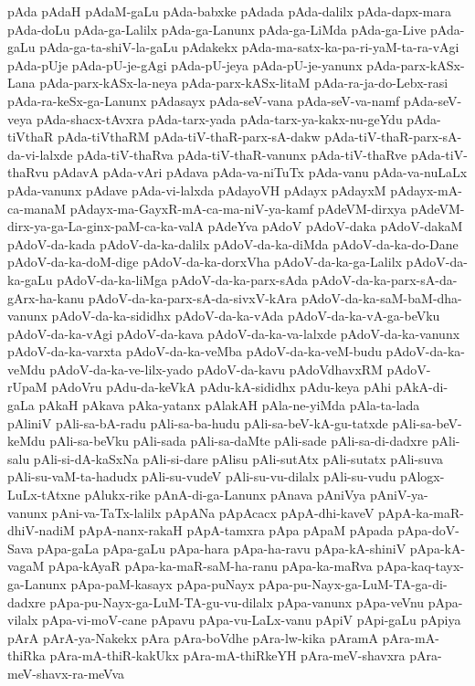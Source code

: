 {pAda
pAdaH
pAdaM-gaLu
pAda-babxke
pAdada
pAda-dalilx
pAda-dapx-mara
pAda-doLu
pAda-ga-Lalilx
pAda-ga-Lanunx
pAda-ga-LiMda
pAda-ga-Live
pAda-gaLu
pAda-ga-ta-shiV-la-gaLu
pAdakekx
pAda-ma-satx-ka-pa-ri-yaM-ta-ra-vAgi
pAda-pUje
pAda-pU-je-gAgi
pAda-pU-jeya
pAda-pU-je-yanunx
pAda-parx-kASx-Lana
pAda-parx-kASx-la-neya
pAda-parx-kASx-litaM
pAda-ra-ja-do-Lebx-rasi
pAda-ra-keSx-ga-Lanunx
pAdasayx
pAda-seV-vana
pAda-seV-va-namf
pAda-seV-veya
pAda-shacx-tAvxra
pAda-tarx-yada
pAda-tarx-ya-kakx-nu-geYdu
pAda-tiVthaR
pAda-tiVthaRM
pAda-tiV-thaR-parx-sA-dakw
pAda-tiV-thaR-parx-sA-da-vi-lalxde
pAda-tiV-thaRva
pAda-tiV-thaR-vanunx
pAda-tiV-thaRve
pAda-tiV-thaRvu
pAdavA
pAda-vAri
pAdava
pAda-va-niTuTx
pAda-vanu
pAda-va-nuLaLx
pAda-vanunx
pAdave
pAda-vi-lalxda
pAdayoVH
pAdayx
pAdayxM
pAdayx-mA-ca-manaM
pAdayx-ma-GayxR-mA-ca-ma-niV-ya-kamf
pAdeVM-dirxya
pAdeVM-dirx-ya-ga-La-ginx-paM-ca-ka-valA
pAdeYva
pAdoV
pAdoV-daka
pAdoV-dakaM
pAdoV-da-kada
pAdoV-da-ka-dalilx
pAdoV-da-ka-diMda
pAdoV-da-ka-do-Dane
pAdoV-da-ka-doM-dige
pAdoV-da-ka-dorxVha
pAdoV-da-ka-ga-Lalilx
pAdoV-da-ka-gaLu
pAdoV-da-ka-liMga
pAdoV-da-ka-parx-sAda
pAdoV-da-ka-parx-sA-da-gArx-ha-kanu
pAdoV-da-ka-parx-sA-da-sivxV-kAra
pAdoV-da-ka-saM-baM-dha-vanunx
pAdoV-da-ka-sididhx
pAdoV-da-ka-vAda
pAdoV-da-ka-vA-ga-beVku
pAdoV-da-ka-vAgi
pAdoV-da-kava
pAdoV-da-ka-va-lalxde
pAdoV-da-ka-vanunx
pAdoV-da-ka-varxta
pAdoV-da-ka-veMba
pAdoV-da-ka-veM-budu
pAdoV-da-ka-veMdu
pAdoV-da-ka-ve-lilx-yado
pAdoV-da-kavu
pAdoVdhavxRM
pAdoV-rUpaM
pAdoVru
pAdu-da-keVkA
pAdu-kA-sididhx
pAdu-keya
pAhi
pAkA-di-gaLa
pAkaH
pAkava
pAka-yatanx
pAlakAH
pAla-ne-yiMda
pAla-ta-lada
pAliniV
pAli-sa-bA-radu
pAli-sa-ba-hudu
pAli-sa-beV-kA-gu-tatxde
pAli-sa-beV-keMdu
pAli-sa-beVku
pAli-sada
pAli-sa-daMte
pAli-sade
pAli-sa-di-dadxre
pAli-salu
pAli-si-dA-kaSxNa
pAli-si-dare
pAlisu
pAli-sutAtx
pAli-sutatx
pAli-suva
pAli-su-vaM-ta-hadudx
pAli-su-vudeV
pAli-su-vu-dilalx
pAli-su-vudu
pAlogx-LuLx-tAtxne
pAlukx-rike
pAnA-di-ga-Lanunx
pAnava
pAniVya
pAniV-ya-vanunx
pAni-va-TaTx-lalilx
pApANa
pApAcacx
pApA-dhi-kaveV
pApA-ka-maR-dhiV-nadiM
pApA-nanx-rakaH
pApA-tamxra
pApa
pApaM
pApada
pApa-doV-Sava
pApa-gaLa
pApa-gaLu
pApa-hara
pApa-ha-ravu
pApa-kA-shiniV
pApa-kA-vagaM
pApa-kAyaR
pApa-ka-maR-saM-ha-ranu
pApa-ka-maRva
pApa-kaq-tayx-ga-Lanunx
pApa-paM-kasayx
pApa-puNayx
pApa-pu-Nayx-ga-LuM-TA-ga-di-dadxre
pApa-pu-Nayx-ga-LuM-TA-gu-vu-dilalx
pApa-vanunx
pApa-veVnu
pApa-vilalx
pApa-vi-moV-cane
pApavu
pApa-vu-LaLx-vanu
pApiV
pApi-gaLu
pApiya
pArA
pArA-ya-Nakekx
pAra
pAra-boVdhe
pAra-lw-kika
pAramA
pAra-mA-thiRka
pAra-mA-thiR-kakUkx
pAra-mA-thiRkeYH
pAra-meV-shavxra
pAra-meV-shavx-ra-meVva
}
